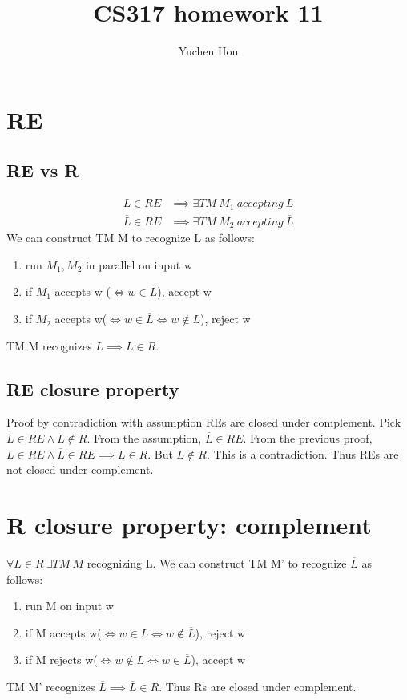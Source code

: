 \documentclass{article}
\begin{document}
\lstset{language=Java}
\title{CS317 homework 11}
\author{Yuchen Hou}
\maketitle

\section{RE}
\subsection{RE vs R}
\begin{align*}
L \in RE &\implies \exists TM \ M_1 \ accepting \ L \\
\overline{L} \in RE &\implies \exists TM \ M_2 \ accepting \ \overline{L}
\end{align*}
We can construct TM M to recognize L as follows:
\begin{enumerate}
  \item run $M_1, M_2$ in parallel on input w
  \item if $M_1 $ accepts w ($\iff w \in L$), accept w
  \item if $M_2$ accepts w($\iff w \in \overline{L} \iff w \notin L $),
  reject w
\end{enumerate}
TM M recognizes $L \implies L \in R$.
\subsection{RE closure property}
Proof by contradiction with assumption REs are closed under complement. Pick
$L \in RE \land L\notin R$. From the assumption, $\overline{L} \in
RE$. From the previous proof, $L \in RE \land \overline{L} \in RE \implies L
\in R$. But $L\notin R$. This is a contradiction. Thus REs are not closed
under complement.

\section{R closure property: complement}
$\forall L \in R \ \exists TM \ M$ recognizing L. We can construct TM M' to
recognize $\overline{L}$ as follows:
\begin{enumerate}
  \item run M on input w
  \item if M accepts w($\iff w \in L \iff w \notin \overline{L}$), reject w
  \item if M rejects w($\iff w \notin L \iff w \in \overline{L}$), accept w
\end{enumerate}
TM M' recognizes $\overline{L} \implies \overline{L} \in R$. Thus Rs are closed
under complement.
\end{document}
